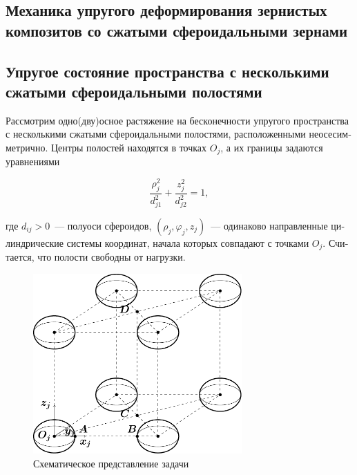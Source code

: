 
\begin{russian}
\chapter[Механика упругого деформирования зернистых композитов со сжатыми сфероидальными зернами]{Механика упругого деформирования зернистых композитов со сжатыми сфероидальными зернами}

\section[Упругое состояние пространства с несколькими сжатыми сфероидальными полостями]{Упругое состояние пространства с несколькими сжатыми сфероидальными полостями}

Рассмотрим одно(дву)осное растяжение на бесконечности упругого пространства с несколькими сжатыми сфероидальными полостями, расположенными неосесимметрично. Центры полостей находятся в точках $O_j$, а их границы задаются уравнениями

\begin{equation}
\frac{{\rho _j^2}}{{d_{j1}^2}} + \frac{{z_j^2}}{{d_{j2}^2}} = 1,
\label{eq:10:12}
\end{equation}

\noindent где $d_{ij}>0$~--- полуоси сфероидов, $(\rho_j,\varphi_j,z_j)$~--- одинаково направленные цилиндрические системы координат, начала которых совпадают с точками $O_j$. Считается, что полости свободны от нагрузки.

\begin{figure}[h!]
\centering
\includegraphics[width=8cm]{oblate-spheroids.pdf}
\caption{Схематическое представление задачи}
\label{f:10:1o}
\end{figure}


\end{russian}

